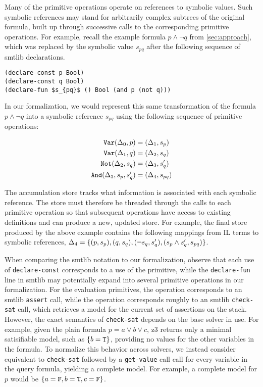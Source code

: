 Many of the primitive operations operate on references to symbolic values. Such
symbolic references may stand for arbitrarily complex subtrees of the original
formula, built up through successive calls to the corresponding primitive
operations.
%
For example, recall the example formula $p\wedge\neg q$ from
\autoref{sec:approach}, which was replaced by the symbolic value $s_{pq}$ after
the following sequence of \acs{smtlib} declarations.
%
\begin{lstlisting}[columns=flexible,keepspaces=true,language=SMTLIB]
(declare-const p Bool)
(declare-const q Bool)
(declare-fun $s_{pq}$ () Bool (and p (not q)))
\end{lstlisting}
%
In our formalization, we would represent this same transformation of the
formula $p\wedge\neg q$ into a symbolic reference $s_{pq}$ using the
following sequence of primitive operations:

\vspace{-2ex}
{\footnotesize
\begin{align*}
\texttt{Var}(\Delta_{0}, p)       &= (\Delta_{1}, s_p) \\
\texttt{Var}(\Delta_{1}, q)       &= (\Delta_{2}, s_q) \\
\texttt{Not}(\Delta_{2}, s_q)       &= (\Delta_{3}, s_q') \\
\texttt{And}(\Delta_{3}, s_p, s_q') &= (\Delta_{4}, s_{pq})
\end{align*}}%

\noindent
%
The accumulation store tracks what information is associated with each symbolic
reference. The store must therefore be threaded through the calls to each
primitive operation so that subsequent operations have access to existing
definitions and can produce a new, updated store.
%
For example, the final store produced by the above example contains the
following mappings from IL terms to symbolic references,
$\aStore{4}=\set{(p,s_p),(q,s_q),(\neg s_q,s_q'),(s_p\wedge s_q',s_{pq})}$.


When comparing the \acs{smtlib} notation to our formalization, observe that
each use of \lstinline{declare-const} corresponds to a use of the \pspawn{}
primitive, while the \lstinline{declare-fun} line in \acs{smtlib} may
potentially expand into several primitive operations in our formalization.
%
For the evaluation primitives, the \passert{} operation corresponds to an
\acs{smtlib} \lstinline{assert} call, while the \pmodel{} operation corresponds
roughly to an \acs{smtlib} \lstinline{check-sat} call, which retrieves a model
for the current set of assertions on the stack.
%
However, the exact semantics of \lstinline{check-sat} depends on the base
solver in use. For example, given the plain formula $p = a \vee b \vee c$, z3
returns only a minimal satisifiable model, such as $\{b = \texttt{T}{}\}$, providing
no values for the other variables in the formula.
%
To normalize this behavior across solvers, we instead consider \pmodel{}
equivalent to \lstinline{check-sat} followed by a \lstinline{get-value} call
call for every variable in the query formula, yielding a complete model. For
example, a complete model for $p$ would be $\set{a=\fls{}, b=\tru{},
c=\fls{}}$.


